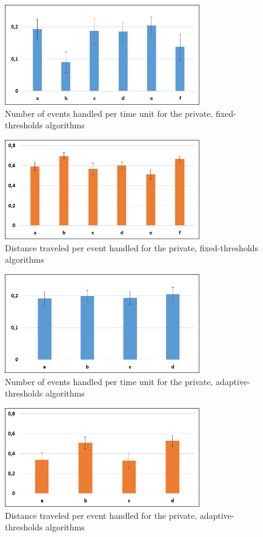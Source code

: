    \begin{figure}[thpb]
      \centering
      \includegraphics[width=8.5cm]{Pictures/PrivFixedMetric1.png}
      \caption{Number of events handled per time unit for the private, fixed-thresholds algorithms}
      \label{figure1}
   \end{figure}
	 \begin{figure}[thpb]
      \centering
      \includegraphics[width=8.5cm]{Pictures/PrivFixedMetric2.png}
      \caption{Distance traveled per event handled for the private, fixed-thresholds algorithms}
      \label{figure2}
   \end{figure}
	\begin{figure}[thpb]
      \centering
      \includegraphics[width=8.5cm]{Pictures/PrivAdaptMetric1.png}
      \caption{Number of events handled per time unit for the private, adaptive-thresholds algorithms}
      \label{figure3}
   \end{figure}
	\begin{figure}[thpb]
      \centering
      \includegraphics[width=8.5cm]{Pictures/PrivAdaptMetric2.png}
      \caption{Distance traveled per event handled for the private, adaptive-thresholds algorithms}
      \label{figure4}
   \end{figure}
